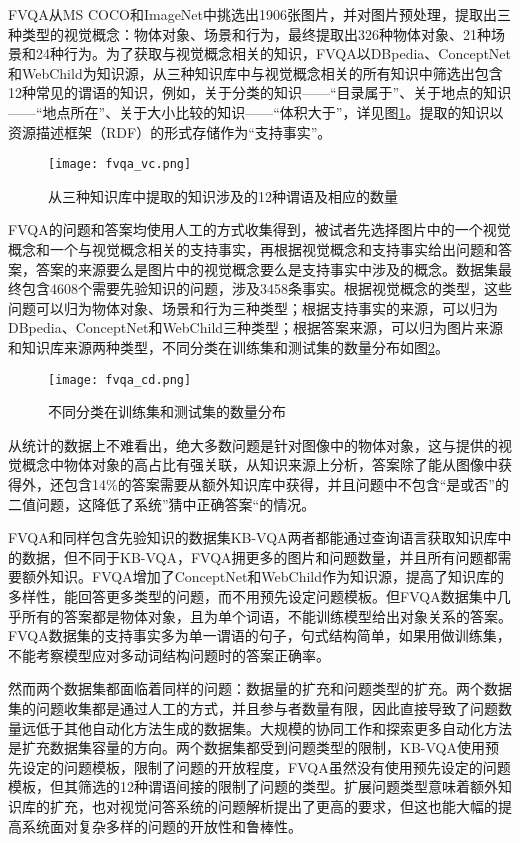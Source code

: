 FVQA从MS COCO和ImageNet中挑选出1906张图片，并对图片预处理，提取出三种类型的视觉概念：物体对象、场景和行为，最终提取出326种物体对象、21种场景和24种行为。为了获取与视觉概念相关的知识，FVQA以DBpedia、ConceptNet和WebChild为知识源，从三种知识库中与视觉概念相关的所有知识中筛选出包含12种常见的谓语的知识，例如，关于分类的知识——“目录属于”、关于地点的知识——“地点所在”、关于大小比较的知识——“体积大于”，详见图\ref{fvqa_vc}。提取的知识以资源描述框架（RDF）的形式存储作为“支持事实”。
\begin{figure}[H]
	\centering
	\texttt{[image: fvqa\_vc.png]}
	\caption{从三种知识库中提取的知识涉及的12种谓语及相应的数量}
	\label{fvqa_vc}
\end{figure}

FVQA的问题和答案均使用人工的方式收集得到，被试者先选择图片中的一个视觉概念和一个与视觉概念相关的支持事实，再根据视觉概念和支持事实给出问题和答案，答案的来源要么是图片中的视觉概念要么是支持事实中涉及的概念。数据集最终包含4608个需要先验知识的问题，涉及3458条事实。根据视觉概念的类型，这些问题可以归为物体对象、场景和行为三种类型；根据支持事实的来源，可以归为DBpedia、ConceptNet和WebChild三种类型；根据答案来源，可以归为图片来源和知识库来源两种类型，不同分类在训练集和测试集的数量分布如图\ref{fvqa_cd}。
\begin{figure}[H]
	\centering
	\texttt{[image: fvqa\_cd.png]}
	\caption{不同分类在训练集和测试集的数量分布}
	\label{fvqa_cd}
\end{figure}

从统计的数据上不难看出，绝大多数问题是针对图像中的物体对象，这与提供的视觉概念中物体对象的高占比有强关联，从知识来源上分析，答案除了能从图像中获得外，还包含14\%的答案需要从额外知识库中获得，并且问题中不包含“是或否”的二值问题，这降低了系统”猜中正确答案“的情况。

FVQA和同样包含先验知识的数据集KB-VQA两者都能通过查询语言获取知识库中的数据，但不同于KB-VQA，FVQA拥更多的图片和问题数量，并且所有问题都需要额外知识。FVQA增加了ConceptNet和WebChild作为知识源，提高了知识库的多样性，能回答更多类型的问题，而不用预先设定问题模板。但FVQA数据集中几乎所有的答案都是物体对象，且为单个词语，不能训练模型给出对象关系的答案。FVQA数据集的支持事实多为单一谓语的句子，句式结构简单，如果用做训练集，不能考察模型应对多动词结构问题时的答案正确率。

然而两个数据集都面临着同样的问题：数据量的扩充和问题类型的扩充。两个数据集的问题收集都是通过人工的方式，并且参与者数量有限，因此直接导致了问题数量远低于其他自动化方法生成的数据集。大规模的协同工作和探索更多自动化方法是扩充数据集容量的方向。两个数据集都受到问题类型的限制，KB-VQA使用预先设定的问题模板，限制了问题的开放程度，FVQA虽然没有使用预先设定的问题模板，但其筛选的12种谓语间接的限制了问题的类型。扩展问题类型意味着额外知识库的扩充，也对视觉问答系统的问题解析提出了更高的要求，但这也能大幅的提高系统面对复杂多样的问题的开放性和鲁棒性。

